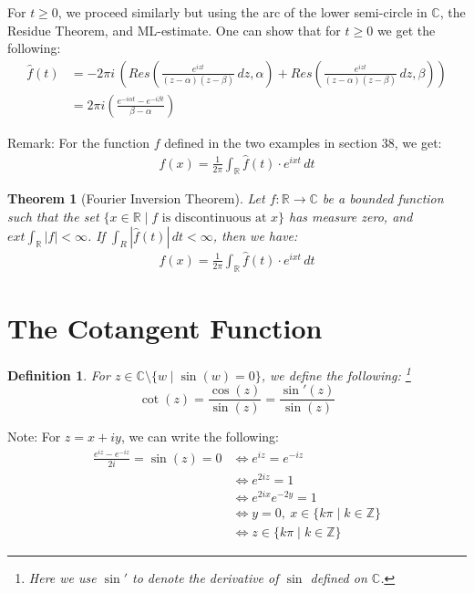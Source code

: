 \documentclass[15pt]{book}
\theoremstyle{break}
\theoremstyle{break}
\newtheorem{thm}{Theorem}[section]
\newtheorem{defn}{Definition}[corL]
\newcommand{\R}{\mathbb{R}}
\newcommand{\Z}{\mathbb{Z}}
\newcommand{\Complex}{\mathbb{C}}
\newcommand{\note}{\color{red}Note: \color{black}}
\newcommand{\remark}{\color{blue}Remark: \color{black}}
\begin{document}
For $t\geq 0$, we proceed similarly but using the arc of the lower semi-circle in $\Complex$, the Residue Theorem, and ML-estimate. One can show that for $t \geq 0$ we get the following:
\begin{align*}
\hat{f}(t) 
&= -2\pi i\, \left(Res\left(\frac{e^{iz t}}{(z-\alpha)(z-\beta)}\, dz, \alpha\right) + Res\left(\frac{e^{iz t}}{(z-\alpha)(z-\beta)}\, dz, \beta\right)\right) \\
&= 2\pi i \left( \frac{e^{-i\alpha t} - e^{-i\beta t}}{\beta -\alpha}\right)
\end{align*}

\hfill\break
\remark For the function $f$ defined in the two examples in section 38, we get:  
\begin{align*}
f(x) = \frac{1}{2\pi} \int_{\R} \hat{f}(t)\cdot e^{ixt}\, dt
\end{align*}

\hfill\break

\begin{thm}[Fourier Inversion Theorem]
Let $f:\R \to \Complex$ be a bounded function such that the set $\{x \in \R \mid f\text{ is discontinuous at }x\}$ has measure zero, and $ext \int_{\R}|f| < \infty$. If $\int_R |\hat{f}(t)|\, dt < \infty$, then we have: \begin{align*}
f(x) = \frac{1}{2\pi} \int_{\R} \hat{f}(t)\cdot e^{ixt}\, dt
\end{align*}
\end{thm}

\newpage
\section[The Cotangent Function]{\color{red}The Cotangent Function\color{black}}
\begin{defn}
For $z \in \Complex \setminus \{w \mid \sin(w) = 0\}$, we define the following: \footnote{Here we use $\sin'$ to denote the derivative of $\sin$ defined on $\Complex$.}
$$\cot(z) = \frac{\cos(z)}{\sin(z)} = \frac{\sin'(z)}{\sin(z)}$$
\end{defn}
\note For $z = x+iy$, we can write the following:
\begin{align*}
\frac{e^{iz}-e^{-iz}}{2i} = \sin(z) = 0 &\iff e^{iz} = e^{-iz}\\
&\iff e^{2iz } = 1\\
&\iff e^{2ix}e^{-2y} = 1\\
&\iff y=0,\ x \in \{k\pi\mid k\in \Z\}\\
&\iff z \in \{k\pi\mid k\in \Z\}
\end{align*}
\end{document}
